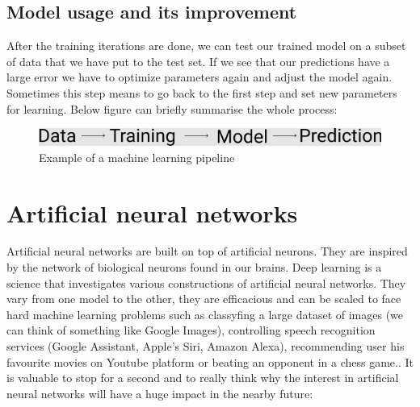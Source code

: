 \documentclass[a4paper,oneside,openright,11pt]{book}
\begin{document}
\subsection{Model usage and its improvement}

After the training iterations are done, we can test our trained model on a subset of data that we have put to the test set. If we see that our predictions have a large error we have to optimize parameters again and adjust the model again. Sometimes this step means to go back to the first step and set new parameters for learning. Below figure can briefly summarise the whole process:

\begin{figure}[h]
\centering
\includegraphics[scale=0.5]{DocumentFigures/MyFigures/strzalkiver.png}
\caption{Example of a machine learning pipeline \cite{MLpipeline} }
\end{figure}




\section{Artificial neural networks}

Artificial neural networks are built on top of artificial neurons. They are inspired by the network of biological neurons found in our brains. Deep learning is a science that investigates various constructions of
artificial neural networks. They vary from one model to the other, they are efficacious and can be scaled to face hard machine learning problems such as classyfing a large dataset of images (we can think of something like Google Images), controlling speech recognition services (Google Assistant, Apple's Siri, Amazon Alexa), recommending user his favourite movies on Youtube platform or beating an opponent in a chess game.\cite{aurelion}\cite{DeepLearningChess}. It is valuable to stop for a second and to really think why the interest in artificial neural networks will have a huge impact in the nearby future: 
 
\end{document}
